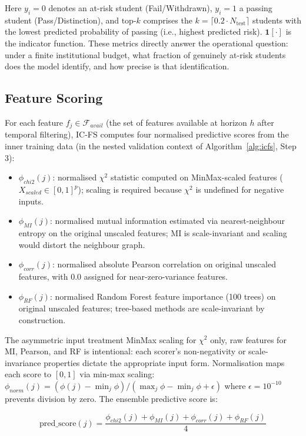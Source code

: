 \documentclass[a4paper,fleqn]{cas-sc}
\begin{document}
Here $y_i=0$ denotes an at-risk student (Fail/Withdrawn), $y_i=1$ a passing student (Pass/Distinction), and $\text{top-}k$ comprises the $k = \lceil 0.2 \cdot N_{\text{test}} \rceil$ students with the lowest predicted probability of passing (i.e., highest predicted risk). $\mathbf{1}[\cdot]$ is the indicator function. These metrics directly answer the operational question: under a finite institutional budget, what fraction of genuinely at-risk students does the model identify, and how precise is that identification.
\subsection{Feature Scoring}

For each feature $f_j \in \mathcal{F}_{avail}$ (the set of features available at horizon $h$ after temporal filtering), IC-FS computes four normalised predictive scores from the inner training data (in the nested validation context of Algorithm~\ref{alg:icfs}, Step 3):

\begin{itemize}
    \item $\phi_{chi2}(j)$: normalised $\chi^2$ statistic computed on MinMax-scaled features ($X_{scaled} \in [0,1]^p$); scaling is required because $\chi^2$ is undefined for negative inputs.
    \item $\phi_{MI}(j)$: normalised mutual information estimated via nearest-neighbour entropy on the original unscaled features; MI is scale-invariant and scaling would distort the neighbour graph.
    \item $\phi_{corr}(j)$: normalised absolute Pearson correlation on original unscaled features, with $0.0$ assigned for near-zero-variance features.
    \item $\phi_{RF}(j)$: normalised Random Forest feature importance (100 trees) on original unscaled features; tree-based methods are scale-invariant by construction.
\end{itemize}

The asymmetric input treatment \textemdash MinMax scaling for $\chi^2$ only, raw features for MI, Pearson, and RF \textemdash is intentional: each scorer's non-negativity or scale-invariance properties dictate the appropriate input form.
Normalisation maps each score to $[0,1]$ via min-max scaling: $\phi_{norm}(j) = (\phi(j) - \min_j\phi) / (\max_j\phi - \min_j\phi + \epsilon)$ where $\epsilon = 10^{-10}$ prevents division by zero. The ensemble predictive score is:

\begin{equation}
    \text{pred\_score}(j) = \frac{\phi_{chi2}(j) + \phi_{MI}(j) + \phi_{corr}(j) + \phi_{RF}(j)}{4}
\end{equation}
\end{document}
